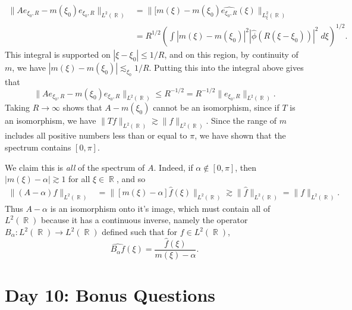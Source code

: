 \documentclass{exam}
\DeclareMathOperator{\RR}{\mathbb{R}}
\theoremstyle{problemstyle}
\newcommand{\1}[1]{\textbf{1}_{\left[#1\right]}} %
\begin{document}
\begin{questions}
\begin{solution}
	\begin{align*}
		\| Ae_{\xi_0,R} - m(\xi_0) e_{\xi_0,R} \|_{L^2(\RR)} &= \| [m(\xi) - m(\xi_0) \widehat{e_{\xi_0,R}}(\xi) \|_{L^2_\xi(\RR)}\\
		&= R^{1/2} \left( \int |m(\xi) - m(\xi_0)|^2 |\widehat{\phi}(R (\xi - \xi_0))|^2\; d\xi \right)^{1/2}.
	\end{align*}
	This integral is supported on $|\xi - \xi_0| \leq 1/R$, and on this region, by continuity of $m$, we have $|m(\xi) - m(\xi_0)| \lesssim_{\xi_0} 1/R$. Putting this into the integral above gives that
	\[ \| Ae_{\xi_0,R} - m(\xi_0) e_{\xi_0,R} \|_{L^2(\RR)} \leq R^{-1/2} = R^{-1/2} \| e_{\xi_0,R} \|_{L^2(\RR)}. \]
	Taking $R \to \infty$ shows that $A - m(\xi_0)$ cannot be an isomorphism, since if $T$ is an isomorphism, we have $\| Tf \|_{L^2(\RR)} \gtrsim \| f \|_{L^2(\RR)}$. Since the range of $m$ includes all positive numbers less than or equal to $\pi$, we have shown that the spectrum contains $[0,\pi]$.

	We claim this is \emph{all} of the spectrum of $A$. Indeed, if $\alpha \not \in [0,\pi]$, then $|m(\xi) - \alpha| \gtrsim 1$ for all $\xi \in \RR$, and so
	\begin{align*}
		\| (A - \alpha) f \|_{L^2(\RR)} &= \| [m(\xi) - \alpha] \widehat{f}(\xi) \|_{L^2(\RR)} \gtrsim \| \widehat{f} \|_{L^2(\RR)} = \| f \|_{L^2(\RR)}.
	\end{align*}
	Thus $A - \alpha$ is an isomorphism onto it's image, which must contain all of $L^2(\RR)$ because it has a continuous inverse, namely the operator $B_\alpha: L^2(\RR) \to L^2(\RR)$ defined such that for $f \in L^2(\RR)$,
	\[ \widehat{B_\alpha f}(\xi) = \frac{\widehat{f}(\xi)}{m(\xi) - \alpha}. \]
\end{solution}

\newpage
\section{Day 10: Bonus Questions}


\end{questions}
\end{document}
